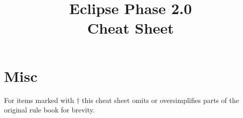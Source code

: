 \documentclass{article}
\title{Eclipse Phase 2.0\\\small{Cheat Sheet}}
\begin{document}
\maketitle













\section*{Misc}

For items marked with $\dagger$ this cheat sheet omits or
oversimplifies parts of the original rule book for brevity.


\end{document}
